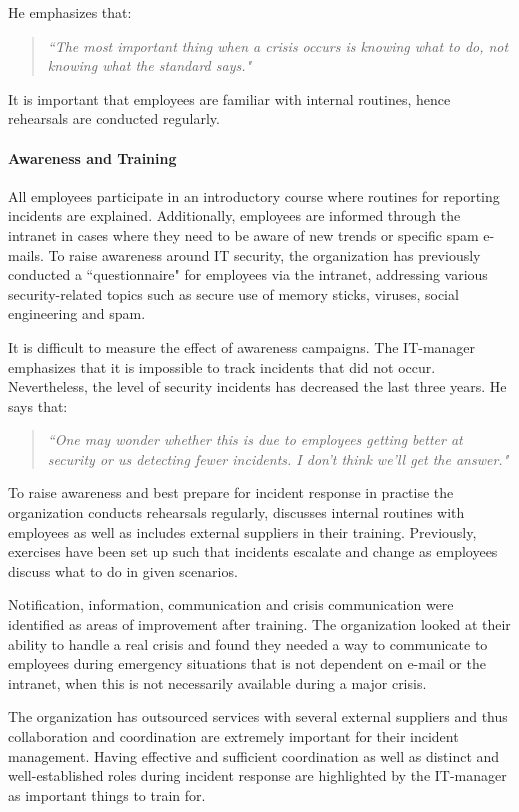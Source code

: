 He emphasizes that:
\begin{quote}
\textit{``The most important thing when a crisis occurs is knowing what to do, not knowing what the standard says."}
\end{quote}
It is important that employees are familiar with internal routines, hence rehearsals are conducted regularly.

\paragraph{Awareness and Training}
All employees participate in an introductory course where routines for reporting incidents are explained. Additionally, employees are informed through the intranet in cases where they need to be aware of new trends or specific spam e-mails. To raise awareness around IT security, the organization has previously conducted a ``questionnaire" for employees via the intranet, addressing various security-related topics such as secure use of memory sticks, viruses, social engineering and spam. 

It is difficult to measure the effect of awareness campaigns. The IT-manager emphasizes that it is impossible to track incidents that did not occur. Nevertheless, the level of security incidents has decreased the last three years. He says that:
\begin{quote}
\textit{``One may wonder whether this is due to employees getting better at security or us detecting fewer incidents. I don't think we'll get the answer."}
\end{quote}
 
To raise awareness and best prepare for incident response in practise the organization conducts rehearsals regularly, discusses internal routines with employees as well as includes external suppliers in their training. Previously, exercises have been set up such that incidents escalate and change as employees discuss what to do in given scenarios.%

Notification, information, communication and crisis communication were identified as areas of improvement after training. The organization looked at their ability to handle a real crisis and found they needed a way to communicate to employees during emergency situations that is not dependent on e-mail or the intranet, when this is not necessarily available during a major crisis.

The organization has outsourced services with several external suppliers and thus collaboration and coordination are extremely important for their incident management. Having effective and sufficient coordination as well as distinct and well-established roles during incident response are highlighted by the IT-manager as important things to train for.

